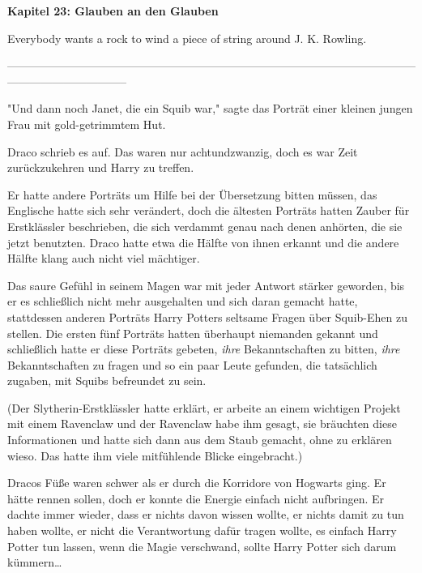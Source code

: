 

\hypertarget{glauben-an-den-glauben}{%

\textbf{Kapitel 23: Glauben an den Glauben\\ }

Everybody wants a rock to wind a piece of string around J. K. Rowling.

--------------------------------------------------------------------------------------------------------------------------------------------

"Und dann noch Janet, die ein Squib war," sagte das Porträt einer kleinen jungen Frau mit gold-getrimmtem Hut.

Draco schrieb es auf. Das waren nur achtundzwanzig, doch es war Zeit zurückzukehren und Harry zu treffen.

Er hatte andere Porträts um Hilfe bei der Übersetzung bitten müssen, das Englische hatte sich sehr verändert, doch die ältesten Porträts hatten Zauber für Erstklässler beschrieben, die sich verdammt genau nach denen anhörten, die sie jetzt benutzten. Draco hatte etwa die Hälfte von ihnen erkannt und die andere Hälfte klang auch nicht viel mächtiger.

Das saure Gefühl in seinem Magen war mit jeder Antwort stärker geworden, bis er es schließlich nicht mehr ausgehalten und sich daran gemacht hatte, stattdessen anderen Porträts Harry Potters seltsame Fragen über Squib-Ehen zu stellen. Die ersten fünf Porträts hatten überhaupt niemanden gekannt und schließlich hatte er diese Porträts gebeten, \emph{ihre} Bekanntschaften zu bitten, \emph{ihre} Bekanntschaften zu fragen und so ein paar Leute gefunden, die tatsächlich zugaben, mit Squibs befreundet zu sein.

(Der Slytherin-Erstklässler hatte erklärt, er arbeite an einem wichtigen Projekt mit einem Ravenclaw und der Ravenclaw habe ihm gesagt, sie bräuchten diese Informationen und hatte sich dann aus dem Staub gemacht, ohne zu erklären wieso. Das hatte ihm viele mitfühlende Blicke eingebracht.)

Dracos Füße waren schwer als er durch die Korridore von Hogwarts ging. Er hätte rennen sollen, doch er konnte die Energie einfach nicht aufbringen. Er dachte immer wieder, dass er nichts davon wissen wollte, er nichts damit zu tun haben wollte, er nicht die Verantwortung dafür tragen wollte, es einfach Harry Potter tun lassen, wenn die Magie verschwand, sollte Harry Potter sich darum kümmern…

}
